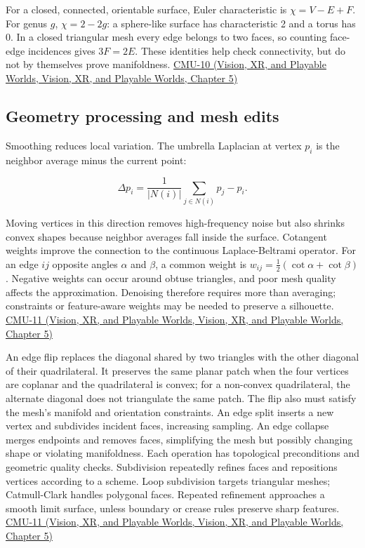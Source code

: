 For a closed, connected, orientable surface, Euler characteristic is \(\chi=V-E+F\). For genus \(g\), \(\chi=2-2g\): a sphere-like surface has characteristic 2 and a torus has 0. In a closed triangular mesh every edge belongs to two faces, so counting face-edge incidences gives \(3F=2E\). These identities help check connectivity, but do not by themselves prove manifoldness. \href{../07-Vision-XR-and-Playable-Worlds/main.pdf\#nameddest=04-visual-computing-ii-ch036-cmu-10---meshes-and-manifolds}{CMU-10 (Vision, XR, and Playable Worlds, Vision, XR, and Playable Worlds, Chapter 5)}

\subsection{Geometry processing and mesh edits}\label{03-visual-computing-i-ch002-geometry-processing-and-mesh-edits}

Smoothing reduces local variation. The umbrella Laplacian at vertex \(p_i\) is the neighbor average minus the current point:

\[
\Delta p_i=\frac1{|N(i)|}\sum_{j\in N(i)}p_j-p_i.
\]

Moving vertices in this direction removes high-frequency noise but also shrinks convex shapes because neighbor averages fall inside the surface. Cotangent weights improve the connection to the continuous Laplace-Beltrami operator. For an edge \(ij\) opposite angles \(\alpha\) and \(\beta\), a common weight is \(w_{ij}=\tfrac12(\cot\alpha+\cot\beta)\). Negative weights can occur around obtuse triangles, and poor mesh quality affects the approximation. Denoising therefore requires more than averaging; constraints or feature-aware weights may be needed to preserve a silhouette. \href{../07-Vision-XR-and-Playable-Worlds/main.pdf\#nameddest=04-visual-computing-ii-ch036-cmu-11---digital-geometry-processing}{CMU-11 (Vision, XR, and Playable Worlds, Vision, XR, and Playable Worlds, Chapter 5)}

An edge flip replaces the diagonal shared by two triangles with the other diagonal of their quadrilateral. It preserves the same planar patch when the four vertices are coplanar and the quadrilateral is convex; for a non-convex quadrilateral, the alternate diagonal does not triangulate the same patch. The flip also must satisfy the mesh's manifold and orientation constraints. An edge split inserts a new vertex and subdivides incident faces, increasing sampling. An edge collapse merges endpoints and removes faces, simplifying the mesh but possibly changing shape or violating manifoldness. Each operation has topological preconditions and geometric quality checks. Subdivision repeatedly refines faces and repositions vertices according to a scheme. Loop subdivision targets triangular meshes; Catmull-Clark handles polygonal faces. Repeated refinement approaches a smooth limit surface, unless boundary or crease rules preserve sharp features. \href{../07-Vision-XR-and-Playable-Worlds/main.pdf\#nameddest=04-visual-computing-ii-ch036-cmu-11---digital-geometry-processing}{CMU-11 (Vision, XR, and Playable Worlds, Vision, XR, and Playable Worlds, Chapter 5)}

